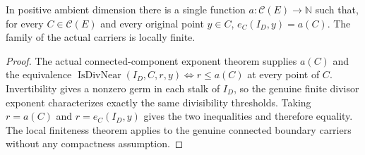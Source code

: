 \begin{lemma}
\label{hir:locally-finite-original-divisor-coefficients}
\leanok
In positive ambient dimension there is a single function
$a:\mathcal C(E)\to\mathbb N$ such that, for every $C\in\mathcal C(E)$
and every original point $y\in C$,
$e_C(I_D,y)=a(C)$.  The family of the actual carriers is locally finite.
\end{lemma}
\begin{proof}
The actual connected-component exponent theorem supplies $a(C)$ and the
equivalence $\operatorname{IsDivNear}(I_D,C,r,y)\Longleftrightarrow r\le a(C)$
at every point of $C$.  Invertibility gives a nonzero germ in each stalk
of $I_D$, so the genuine finite divisor exponent characterizes exactly
the same divisibility thresholds.  Taking $r=a(C)$ and
$r=e_C(I_D,y)$ gives the two inequalities and therefore equality.
The local finiteness theorem applies to the genuine connected boundary
carriers without any compactness assumption.
\end{proof}

